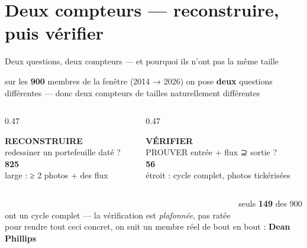 \documentclass[11pt,aspectratio=169]{beamer}
\newcommand{\badge}[2]{\colorbox{#1}{\textcolor{white}{\footnotesize\textbf{#2}}}}
\newcommand{\colS}{}
\begin{document}
\section{Deux compteurs — reconstruire, puis vérifier}
\begin{frame}{Deux questions, deux compteurs — et pourquoi ils n'ont pas la même taille}
  \colS
  \centering
  {\footnotesize sur les \textbf{900} membres de la fenêtre (2014 → 2026) on pose \textbf{deux}
   questions différentes — donc deux compteurs de tailles naturellement différentes}\\[2mm]
  \begin{columns}[T]
    \begin{column}{0.47\textwidth}\centering
      \colorbox{helec}{\parbox[c][22mm][c]{0.9\linewidth}{\centering\color{white}
        \textbf{RECONSTRUIRE}\\[0.4mm]{\scriptsize redessiner un portefeuille daté ?}\\[1.2mm]
        {\Large\textbf{825}}\\[0.3mm]{\scriptsize large : ≥ 2 photos + des flux}}}
    \end{column}
    \begin{column}{0.47\textwidth}\centering
      \colorbox{okgreen}{\parbox[c][22mm][c]{0.9\linewidth}{\centering\color{white}
        \textbf{VÉRIFIER}\\[0.4mm]{\scriptsize PROUVER entrée + flux ⊇ sortie ?}\\[1.2mm]
        {\Large\textbf{56}}\\[0.3mm]{\scriptsize étroit : cycle complet, photos tickérisées}}}
    \end{column}
  \end{columns}
  \vspace{2mm}
  {\footnotesize \badge{alertred}{ces deux nombres ne s'additionnent ni ne se comparent}\;
   {\color{black!60}seuls \textbf{149} des 900 ont un cycle complet — la vérification est \emph{plafonnée}, pas ratée}}\\[1.5mm]
  {\scriptsize\color{black!60} pour rendre tout ceci concret, on suit un membre réel de bout en bout : \textbf{Dean Phillips}}
\end{frame}
\end{document}
